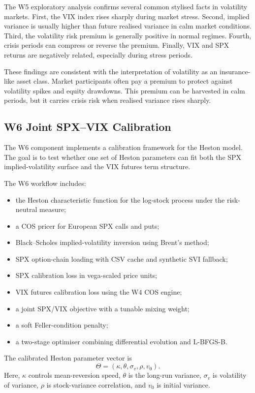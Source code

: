 The W5 exploratory analysis confirms several common stylised facts in volatility markets. First, the VIX index rises sharply during market stress. Second, implied variance is usually higher than future realised variance in calm market conditions. Third, the volatility risk premium is generally positive in normal regimes. Fourth, crisis periods can compress or reverse the premium. Finally, VIX and SPX returns are negatively related, especially during stress periods.

These findings are consistent with the interpretation of volatility as an insurance-like asset class. Market participants often pay a premium to protect against volatility spikes and equity drawdowns. This premium can be harvested in calm periods, but it carries crisis risk when realised variance rises sharply.

\subsection{W6 Joint SPX--VIX Calibration}

The W6 component implements a calibration framework for the Heston model. The goal is to test whether one set of Heston parameters can fit both the SPX implied-volatility surface and the VIX futures term structure.

The W6 workflow includes:
\begin{itemize}
    \item the Heston characteristic function for the log-stock process under the risk-neutral measure;
    \item a COS pricer for European SPX calls and puts;
    \item Black--Scholes implied-volatility inversion using Brent's method;
    \item SPX option-chain loading with CSV cache and synthetic SVI fallback;
    \item SPX calibration loss in vega-scaled price units;
    \item VIX futures calibration loss using the W4 COS engine;
    \item a joint SPX/VIX objective with a tunable mixing weight;
    \item a soft Feller-condition penalty;
    \item a two-stage optimiser combining differential evolution and L-BFGS-B.
\end{itemize}

The calibrated Heston parameter vector is
\begin{equation}
\Theta
=
(\kappa,\theta,\sigma_v,\rho,v_0).
\end{equation}
Here, \(\kappa\) controls mean-reversion speed, \(\theta\) is the long-run variance, \(\sigma_v\) is volatility of variance, \(\rho\) is stock-variance correlation, and \(v_0\) is initial variance.

